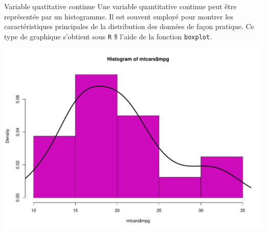 \documentclass[
  8pt,
  ignorenonframetext,
]{beamer}
\newenvironment{Shaded}{\begin{snugshade}}{\end{snugshade}}
\newcommand{\AttributeTok}[1]{\textcolor[rgb]{0.77,0.63,0.00}{#1}}
\newcommand{\DecValTok}[1]{\textcolor[rgb]{0.00,0.00,0.81}{#1}}
\newcommand{\FunctionTok}[1]{\textcolor[rgb]{0.00,0.00,0.00}{#1}}
\newcommand{\NormalTok}[1]{#1}
\newcommand{\SpecialCharTok}[1]{\textcolor[rgb]{0.00,0.00,0.00}{#1}}
\begin{document}
\begin{frame}[fragile]{Variable quatitative continue}
\protect\hypertarget{variable-quatitative-continue}{}
Une variable quantitative continue peut être représentée par un
histogramme. Il est souvent employé pour montrer les caractéristiques
principales de la distribution des données de façon pratique. Ce type de
graphique s'obtient sous \texttt{R} \$ l'aide de la fonction
\texttt{boxplot}. \pause

\begin{Shaded}
\end{Shaded}

\begin{center}\includegraphics[width=0.8\linewidth]{Chap2_R_files/figure-beamer/unnamed-chunk-21-1} \end{center}
\end{frame}
\end{document}
